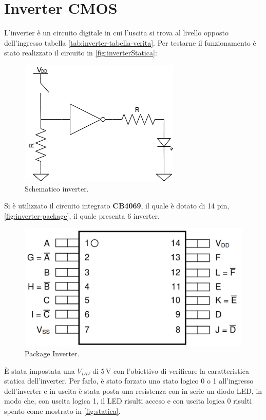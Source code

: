 \documentclass[a4paper,12pt]{article}
\begin{document}
\section*{Inverter CMOS}
L'inverter è un circuito digitale in cui l'uscita si trova al livello opposto dell'ingresso tabella \ref{tab:inverter-tabella-verita}. Per testarne il funzionamento è stato realizzato il circuito in \autoref{fig:inverterStatica}:

\begin{figure}[h]
	\centering
	\includegraphics[width=0.4\linewidth]{immagini/inverter/circuitoLogico1Led.png}
	\caption{Schematico inverter.}
	\label{fig:inverterStatica}
\end{figure}


\noindent Si è utilizzato il circuito integrato \textbf{CB4069}, il quale è dotato di 14 pin, \autoref{fig:inverter-package}, il quale presenta 6 inverter.

\begin{figure}[h]
	\centering
	\includegraphics[width=0.3\linewidth]{immagini/inverter/package-inverter.png}
	\caption{Package Inverter.}
	\label{fig:inverter-package}
\end{figure}


È stata impostata una $V_{DD}$ di $5\,\mathrm{V}$ con l’obiettivo di verificare la caratteristica statica dell’inverter.
Per farlo, è stato forzato uno stato logico 0 o 1 all’ingresso dell’inverter e in uscita è stata posta una resistenza con in serie un diodo LED, in modo che, con uscita logica 1, il LED risulti acceso e con uscita logica 0 risulti spento come mostrato in \autoref{fig:statica}.
\end{document}

